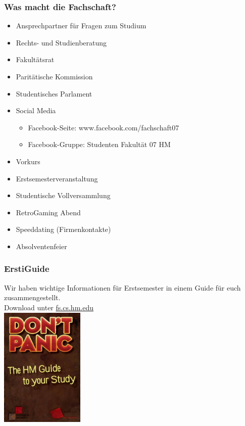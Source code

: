 \documentclass{beamer}
\begin{document}
	\begin{frame}[t]
		\frametitle{Was macht die Fachschaft?}
		
		\begin{itemize}
			\item Ansprechpartner für Fragen zum Studium
			\item Rechts- und Studienberatung
			\item Fakultätsrat
			\item Paritätische Kommission
			\item Studentisches Parlament
			\item Social Media
			\begin{itemize}
				\item Facebook-Seite: www.facebook.com/fachschaft07
				\item Facebook-Gruppe: Studenten Fakultät 07 HM
			\end{itemize}
		\end{itemize}
		\bigskip
		\begin{itemize}
			\item Vorkurs
			\item Erstsemesterveranstaltung
			\item Studentische Vollversammlung
			\item RetroGaming Abend
			\item Speeddating (Firmenkontakte)
			\item Absolventenfeier
		\end{itemize}
	\end{frame}
	
	\begin{frame}[t]
		\frametitle{ErstiGuide}
		Wir haben wichtige Informationen für Erstsemester in einem Guide für euch zusammengestellt.\\
		\bigskip
		Download unter \url{fs.cs.hm.edu}\\
		\center
		\includegraphics[width=0.3\textwidth]{erstiguide.jpg}
	\end{frame}
	
\end{document}
